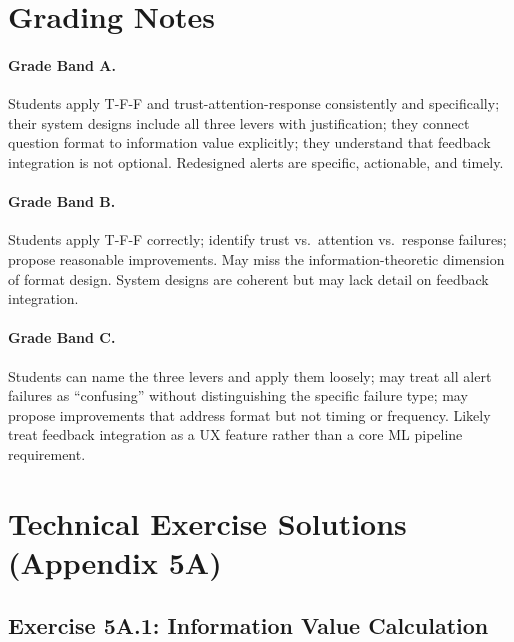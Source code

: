 \section{Grading Notes}

\paragraph{Grade Band A.} Students apply T-F-F and trust-attention-response consistently and specifically; their system designs include all three levers with justification; they connect question format to information value explicitly; they understand that feedback integration is not optional. Redesigned alerts are specific, actionable, and timely.

\paragraph{Grade Band B.} Students apply T-F-F correctly; identify trust vs.\ attention vs.\ response failures; propose reasonable improvements. May miss the information-theoretic dimension of format design. System designs are coherent but may lack detail on feedback integration.

\paragraph{Grade Band C.} Students can name the three levers and apply them loosely; may treat all alert failures as ``confusing'' without distinguishing the specific failure type; may propose improvements that address format but not timing or frequency. Likely treat feedback integration as a UX feature rather than a core ML pipeline requirement.

\section{Technical Exercise Solutions (Appendix 5A)}

\subsection{Exercise 5A.1: Information Value Calculation}

